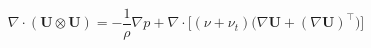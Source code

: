 \documentclass[12pt]{article}
\begin{document}
\begin{equation*}
\nabla \cdot (\mathbf{U} \otimes \mathbf{U}) = -\frac{1}{\rho}\nabla p + \nabla \cdot \bigl[(\nu + \nu_t)\bigl(\nabla \mathbf{U} + (\nabla \mathbf{U})^\top\bigr)\bigr]
\end{equation*}
\end{document}
